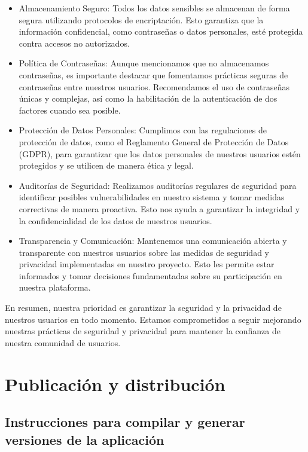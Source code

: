 \documentclass{article}
\begin{document}
    \begin{itemize}
        \item Almacenamiento Seguro: Todos los datos sensibles se almacenan de forma segura utilizando protocolos de encriptación. Esto garantiza que la información confidencial, como contraseñas o datos personales, esté protegida contra accesos no autorizados.
    
        \item Política de Contraseñas: Aunque mencionamos que no almacenamos contraseñas, es importante destacar que fomentamos prácticas seguras de contraseñas entre nuestros usuarios. Recomendamos el uso de contraseñas únicas y complejas, así como la habilitación de la autenticación de dos factores cuando sea posible.
    
        \item Protección de Datos Personales: Cumplimos con las regulaciones de protección de datos, como el Reglamento General de Protección de Datos (GDPR), para garantizar que los datos personales de nuestros usuarios estén protegidos y se utilicen de manera ética y legal.
    
        \item Auditorías de Seguridad: Realizamos auditorías regulares de seguridad para identificar posibles vulnerabilidades en nuestro sistema y tomar medidas correctivas de manera proactiva. Esto nos ayuda a garantizar la integridad y la confidencialidad de los datos de nuestros usuarios.
    
        \item Transparencia y Comunicación: Mantenemos una comunicación abierta y transparente con nuestros usuarios sobre las medidas de seguridad y privacidad implementadas en nuestro proyecto. Esto les permite estar informados y tomar decisiones fundamentadas sobre su participación en nuestra plataforma.
        
    \end{itemize}
    
    En resumen, nuestra prioridad es garantizar la seguridad y la privacidad de nuestros usuarios en todo momento. Estamos comprometidos a seguir mejorando nuestras prácticas de seguridad y privacidad para mantener la confianza de nuestra comunidad de usuarios.

\section{Publicación y distribución}

    \subsection{Instrucciones para compilar y generar versiones de la aplicación}
\end{document}
